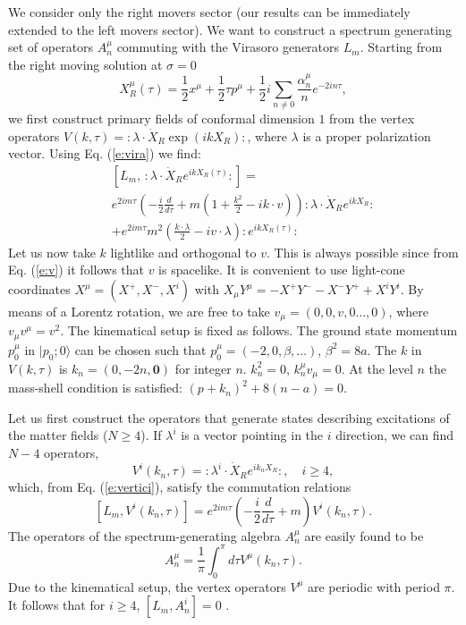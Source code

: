 \documentclass[a4paper,aps,prd,twocolumn,groupedaddress]{revtex4}
\begin{document}
We consider only the right movers sector (our results can be
immediately extended to the left movers sector).  We want to construct
a spectrum generating set of operators $A^\mu_n$ commuting with the
Virasoro generators $L_m$.  Starting from the right moving solution at
$\sigma=0$
\begin{displaymath}
X^\mu_R(\tau) = \frac{1}{2}x^\mu + \frac{1}{2}\tau p^\mu +
\frac{1}{2}i\sum_{n\ne0} \frac{\alpha_n^\mu}{n}e^{-2in\tau},
\end{displaymath}
we first construct primary fields of conformal dimension $1$ from the
vertex operators $V(k,\tau) = :\lambda\cdot\dot{X}_R\exp(ikX_R):$,
where $\lambda$ is a proper polarization vector. Using
Eq. (\ref{e:vira}) we find:
\begin{eqnarray}\label{e:vertici}
&& [L_m,\,:\lambda\cdot\dot{X}_Re^{ikX_R(\tau)}:] = \nonumber \\
&&e^{2im\tau}\left( -\frac{i}{2}\frac{d}{d\tau} +m(1+\frac{k^2}{2}-
ik\cdot
v)\right):\lambda\cdot\dot{X}_Re^{ikX_R}: \nonumber \\
 && + e^{2im\tau}m^2\left( \frac{k\cdot\lambda}{2}
-iv\cdot\lambda\right):e^{ikX_R(\tau)}:
\end{eqnarray}
Let us now take $k$ lightlike and orthogonal to $v$. This is always
possible since from Eq. (\ref{e:v}) it follows that $v$ is
spacelike. It is convenient to use light-cone coordinates $X^\mu =
(X^+,X^-,X^i)$ with $X_\mu Y^\mu = -X^+ Y^- - X^- Y^+ + X^iY^i$. By
means of a Lorentz rotation, we are free to take
$v_\mu=(0,0,v,0\ldots,0)$, where $v_\mu v^\mu=v^2$. The kinematical
setup is fixed as follows.  The ground state momentum $p_0^\mu$ in
$|p_0;0\rangle$ can be chosen such that $p_0^\mu=(-2,0,\beta,\ldots)$,
$\beta^2= 8a$. The $k$ in $V(k,\tau)$ is $k_n = (0,-2n,\mathbf{0})$
for integer $n$. $k_n^2=0$, $k_n^\mu v_\mu=0$. At the level $n$ the
mass-shell condition is satisfied: $(p+k_n)^2 +8(n-a) =0$.

Let us first construct the operators that generate states describing
excitations of the matter fields ($N\ge 4$).  If $\lambda^i$ is a
vector pointing in the $i$ direction, we can find $N-4$ operators,
\begin{equation}\label{e:norm}
V^i(k_n,\tau) = :\lambda^i\cdot\dot{X}_R e^{ik_nX_R}:, \quad i\ge 4 ,
\end{equation}
which, from Eq. (\ref{e:vertici}), satisfy the commutation relations
\begin{equation}\label{e:buona}
[L_m,V^i(k_n,\tau)] = e^{2im\tau}\left
 ( -\frac{i}{2}\frac{d}{d\tau} +m
 \right)V^i(k_n,\tau).
\end{equation}
The operators of the spectrum-generating algebra $A^\mu_n$ are easily
found to be
\begin{displaymath}
A^\mu_n = \frac{1}{\pi}\int_0^{\pi}d\tau V^\mu(k_n,\tau).
\end{displaymath}
Due to the kinematical setup, the vertex operators $V^\mu$ are
periodic with period $\pi$. It follows that for
$i\ge 4$, $[L_m,A_n^{i}]=0$ .
\end{document}
